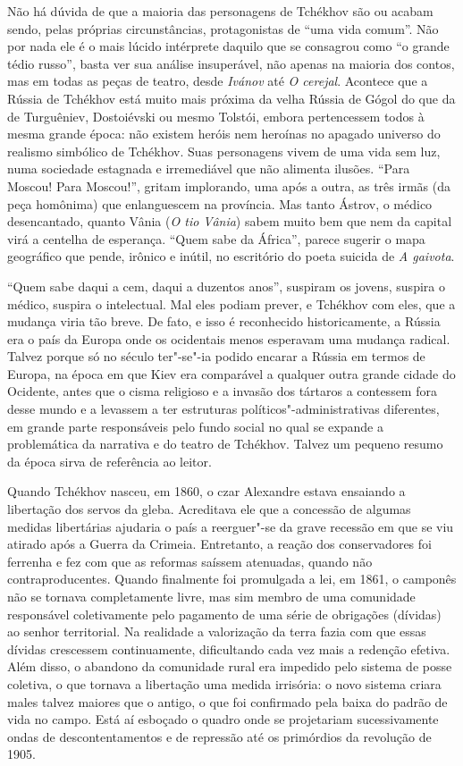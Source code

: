 {{Não há dúvida de que a maioria das personagens de Tchékhov são ou acabam
sendo, pelas próprias circunstâncias, protagonistas de ``uma vida
comum''. Não por nada ele é o mais lúcido intérprete daquilo que se
consagrou como ``o grande tédio russo'', basta ver sua análise
insuperável, não apenas na maioria dos contos, mas em todas as peças de
teatro, desde \emph{Ivánov} até \emph{O cerejal}. Acontece que a Rússia
de Tchékhov está muito mais próxima da velha Rússia de Gógol do que da
de Turguêniev, Dostoiévski ou mesmo Tolstói, embora pertencessem todos à
mesma grande época: não existem heróis nem heroínas no apagado universo
do realismo simbólico de Tchékhov. Suas personagens vivem de uma vida
sem luz, numa sociedade estagnada e irremediável que não alimenta
ilusões. ``Para Moscou! Para Moscou!'', gritam implorando, uma após a
outra, as três irmãs (da peça homônima) que enlanguescem na província.
Mas tanto Ástrov, o médico desencantado, quanto Vânia (\emph{O tio Vânia})
sabem muito bem que nem da capital virá a centelha de esperança. ``Quem
sabe da África'', parece sugerir o mapa geográfico que pende, irônico
e inútil, no escritório do poeta suicida de \emph{A gaivota}.

``Quem sabe daqui a cem, daqui a duzentos anos'', suspiram os jovens,
suspira o médico, suspira o intelectual. Mal eles podiam prever, e
Tchékhov com eles, que a mudança viria tão breve. De fato, e isso é
reconhecido historicamente, a Rússia era o país da Europa onde os
ocidentais menos esperavam uma mudança radical. Talvez porque só no
século  ter"-se"-ia podido encarar a Rússia em termos de Europa, na época
em que Kiev era comparável a qualquer outra grande cidade do Ocidente,
antes que o cisma religioso e a invasão dos tártaros a contessem fora
desse mundo e a levassem a ter estruturas políticos"-administrativas
diferentes, em grande parte responsáveis pelo fundo social no qual se
expande a problemática da narrativa e do teatro de Tchékhov. Talvez um
pequeno resumo da época sirva de referência ao leitor.

Quando Tchékhov nasceu, em 1860, o czar Alexandre  estava ensaiando a
libertação dos servos da gleba. Acreditava ele que a concessão de
algumas medidas libertárias ajudaria o país a reerguer"-se da grave
recessão em que se viu atirado após a Guerra da Crimeia. Entretanto, a
reação dos conservadores foi ferrenha e fez com que as reformas saíssem
atenuadas, quando não contraproducentes. Quando finalmente foi
promulgada a lei, em 1861, o camponês não se tornava completamente
livre, mas sim membro de uma comunidade responsável coletivamente pelo
pagamento de uma série de obrigações (dívidas) ao senhor territorial. Na realidade a
valorização da terra fazia com que essas dívidas crescessem continuamente,
dificultando cada vez mais a redenção efetiva. Além disso, o abandono da
comunidade rural era impedido pelo sistema de posse coletiva, o que
tornava a libertação uma medida irrisória: o novo sistema criara males talvez maiores que o
antigo, o que foi confirmado pela baixa do padrão de vida no campo. Está aí esboçado o quadro onde se
projetariam sucessivamente ondas de descontentamentos e de repressão até
os primórdios da revolução de 1905.

}}
